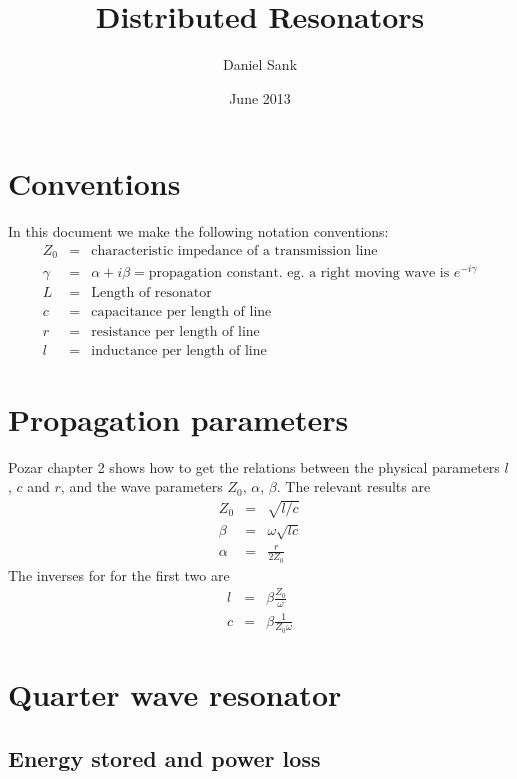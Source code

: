\documentclass{article}
\title{Distributed Resonators}
\author{Daniel Sank}
\date{June 2013}
\begin{document}
\maketitle

\tableofcontents

\section{Conventions}

In this document we make the following notation conventions: \begin{eqnarray*}
Z_0 &=& \textrm{characteristic impedance of a transmission line} \\
\gamma &=& \alpha+i\beta = \textrm{propagation constant. eg. a right moving wave is } e^{-i\gamma} \\
L &=& \textrm{Length of resonator} \\
c &=& \textrm{capacitance per length of line} \\
r &=& \textrm{resistance per length of line} \\
l &=& \textrm{inductance per length of line} \end{eqnarray*}

\section{Propagation parameters}

Pozar chapter 2 shows how to get the relations between the physical parameters $l$, $c$ and $r$, and the wave parameters $Z_0$, $\alpha$, $\beta$. The relevant results are \begin{eqnarray*}
Z_0 &=& \sqrt{l/c} \\
\beta &=& \omega \sqrt{lc} \\
\alpha &=& \frac{r}{2Z_0} \end{eqnarray*}
The inverses for for the first two are \begin{eqnarray*}
l &=& \beta \frac{Z_0}{\omega} \\
c &=& \beta \frac{1}{Z_0 \omega} \end{eqnarray*}

\section{Quarter wave resonator}

\subsection{Energy stored and power loss}
\end{document}
